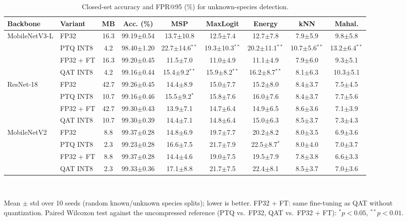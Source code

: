 \begin{table}[t]
\centering
\caption{Closed-set accuracy and FPR@95 (\%) for unknown-species detection.}
\label{tab:fpr95}
\setlength{\tabcolsep}{3.5pt}
\footnotesize
\begin{tabular}{llccccccc}
\toprule
Backbone & Variant & MB & Acc. (\%) & MSP & MaxLogit & Energy & kNN & Mahal. \\
\midrule
MobileNetV3-L & FP32 & 16.3 & 99.19$\pm$0.54 & 13.7$\pm$10.8 & 12.5$\pm$7.4 & 12.7$\pm$7.8 & 7.9$\pm$5.9 & 9.8$\pm$5.8 \\
 & PTQ INT8 & 4.2 & 98.40$\pm$1.20 & 22.7$\pm$14.6$^{**}$ & 19.3$\pm$10.3$^{**}$ & 20.2$\pm$11.1$^{**}$ & 10.7$\pm$5.6$^{**}$ & 13.2$\pm$6.4$^{**}$ \\
 & FP32 + FT & 16.3 & 99.20$\pm$0.45 & 11.5$\pm$7.0 & 11.0$\pm$4.9 & 11.1$\pm$4.9 & 7.9$\pm$6.0 & 9.3$\pm$5.1 \\
 & QAT INT8 & 4.2 & 99.16$\pm$0.44 & 15.4$\pm$9.2$^{**}$ & 15.9$\pm$8.2$^{**}$ & 16.2$\pm$8.7$^{**}$ & 8.1$\pm$6.3 & 10.3$\pm$5.1 \\
\midrule
ResNet-18 & FP32 & 42.7 & 99.26$\pm$0.45 & 14.4$\pm$8.9 & 15.0$\pm$7.7 & 15.2$\pm$8.0 & 8.4$\pm$3.7 & 7.5$\pm$4.5 \\
 & PTQ INT8 & 10.7 & 99.16$\pm$0.46 & 15.5$\pm$9.2$^{*}$ & 15.8$\pm$7.6 & 16.0$\pm$7.6 & 8.4$\pm$3.7 & 7.7$\pm$5.6 \\
 & FP32 + FT & 42.7 & 99.30$\pm$0.43 & 13.9$\pm$7.1 & 14.7$\pm$6.4 & 14.9$\pm$6.5 & 8.6$\pm$3.6 & 7.1$\pm$3.9 \\
 & QAT INT8 & 10.7 & 99.30$\pm$0.39 & 14.4$\pm$7.1 & 14.8$\pm$6.4 & 15.0$\pm$6.3 & 8.5$\pm$3.7 & 7.3$\pm$4.3 \\
\midrule
MobileNetV2 & FP32 & 8.8 & 99.37$\pm$0.28 & 14.8$\pm$6.9 & 19.7$\pm$7.7 & 20.2$\pm$8.2 & 8.0$\pm$3.5 & 6.9$\pm$3.6 \\
 & PTQ INT8 & 2.3 & 99.23$\pm$0.28 & 16.6$\pm$7.5 & 21.7$\pm$7.9 & 22.5$\pm$8.7$^{*}$ & 8.0$\pm$4.0 & 7.0$\pm$3.7 \\
 & FP32 + FT & 8.8 & 99.37$\pm$0.28 & 14.4$\pm$4.6 & 19.0$\pm$7.5 & 19.5$\pm$7.9 & 7.8$\pm$3.8 & 6.6$\pm$3.3 \\
 & QAT INT8 & 2.3 & 99.33$\pm$0.36 & 17.1$\pm$8.8 & 21.7$\pm$7.5 & 22.4$\pm$8.1 & 8.5$\pm$3.7 & 7.0$\pm$3.6 \\
\bottomrule
\end{tabular}
\\[2pt]\parbox{\linewidth}{\scriptsize Mean $\pm$ std over 10 seeds (random known/unknown species splits); lower is better. FP32 + FT: same fine-tuning as QAT without quantization. Paired Wilcoxon test against the uncompressed reference (PTQ vs.\ FP32, QAT vs.\ FP32 + FT): $^{*}p<0.05$, $^{**}p<0.01$.}
\end{table}